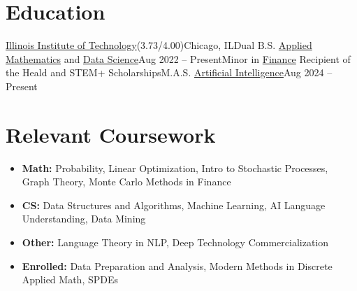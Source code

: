 \documentclass[letterpaper,10pt]{article}
\makeatletter
\newcommand{\resumeSubheading}[4]{
    \item\vspace{-2pt}
    \begin{tabular*}{0.97\textwidth}[t]{l@{\extracolsep{\fill}}r}
      \textbf{#1} & #2 \\
      #3 & #4 \\
    \end{tabular*}%
}
\newcommand{\resumeSubHeadingListStart}{\begin{itemize}[leftmargin=0.15in, label=]}
\newcommand{\resumeSubHeadingListEnd}{\end{itemize}}
\makeatother
\begin{document}
\section{Education}
  \resumeSubHeadingListStart
    \resumeEducationHeading
      {\href{https://www.iit.edu/}{Illinois Institute of Technology}}{(3.73/4.00)}{Chicago, IL}{Dual B.S. \href{https://catalog.iit.edu/undergraduate/colleges/computing/applied-mathematics/bs/\#text}{Applied Mathematics} and \href{https://catalog.iit.edu/undergraduate/colleges/computing/computer-science/\#:~:text=The\%20B.S.\%20in\%20Data,be\%20successful\%20data\%20science\%20professionals.}{Data Science}}{Aug 2022 -- Present}{Minor in
      \href{https://catalog.iit.edu/undergraduate/colleges/business/minor-finance/\#:~:text=business\%20schools\%20worldwide.-,Required\%20Courses,-Course\%20List}{Finance}}
      {Recipient of the Heald and STEM+ Scholarships}{M.A.S. \href{https://catalog.iit.edu/graduate/colleges/computing/computer-science/master-artificial-intelligence/\#overviewtext}{Artificial Intelligence}}{Aug 2024 -- Present}
  \resumeSubHeadingListEnd

\vspace{-12pt}
\section{Relevant Coursework}
\resumeSubHeadingListStart
    \item \textbf{Math:} Probability, Linear Optimization, Intro to Stochastic Processes, Graph Theory, Monte Carlo Methods in Finance \vspace{-5pt}
    \item \textbf{CS:} Data Structures and Algorithms, Machine Learning, AI Language Understanding, Data Mining \vspace{-5pt}
    \item \textbf{Other:} Language Theory in NLP, Deep Technology Commercialization \vspace{-5pt}
    \item \textbf{Enrolled:} Data Preparation and Analysis, Modern Methods in Discrete Applied Math, SPDEs
\resumeSubHeadingListEnd
\end{document}
